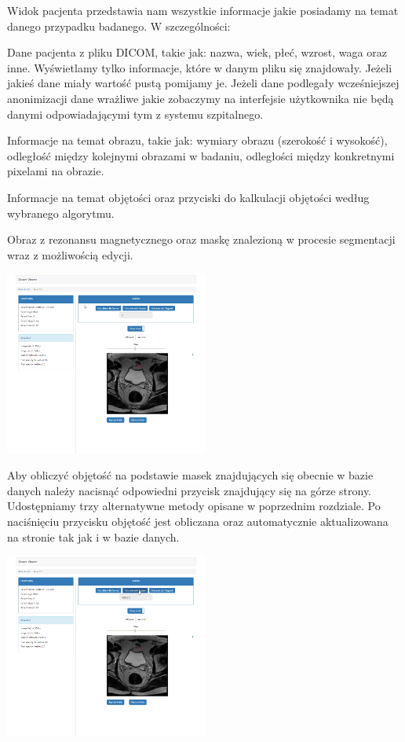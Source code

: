 \documentclass[a4paper,11pt,twoside]{report}
\theoremstyle{definition}
\begin{document}
Widok pacjenta przedstawia nam wszystkie informacje jakie posiadamy na temat danego przypadku badanego. W szczególności:
\begin{description}
\item Dane pacjenta z pliku DICOM, takie jak: nazwa, wiek, płeć, wzrost, waga oraz inne. Wyświetlamy tylko informacje, które w danym pliku się znajdowały. Jeżeli jakieś dane miały wartość pustą pomijamy je. Jeżeli dane podlegały wcześniejszej anonimizacji dane wrażliwe jakie zobaczymy na interfejsie użytkownika nie będą danymi odpowiadającymi tym z systemu szpitalnego.
\item Informacje na temat obrazu, takie jak: wymiary obrazu (szerokość i wysokość), odległość między kolejnymi obrazami w badaniu, odległości między konkretnymi pixelami na obrazie.
\item Informacje na temat objętości oraz przyciski do kalkulacji objętości według wybranego algorytmu.
\item Obraz z rezonansu magnetycznego oraz maskę znalezioną w procesie segmentacji wraz z możliwością edycji.
\end{description}

\begin{minipage}{\linewidth}
	\centering
	\includegraphics[width=0.5\textwidth]{FrontScreen/Patient/22.png}
\end{minipage}

Aby obliczyć objętość na podstawie masek znajdujących się obecnie w bazie danych należy nacisnąć odpowiedni przycisk znajdujący się na górze strony. Udostępniamy trzy alternatywne metody opisane w poprzednim rozdziale. Po naciśnięciu przycisku objętość jest obliczana oraz automatycznie aktualizowana na stronie tak jak i w bazie danych.

\begin{minipage}{\linewidth}
	\centering
	\includegraphics[width=0.5\textwidth]{FrontScreen/Patient/343.png}
\end{minipage}
\end{document}
